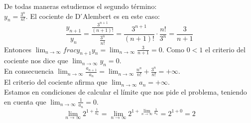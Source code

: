 \documentclass[../Teoría.root.tex]{subfiles}
\begin{document}
De todas maneras estudiemos el segundo término:\\
\(y_n=\frac{3^n}{n!}\).
El cociente de D ́Alembert es en este caso:
\[\frac{y_{n+1}}{y_n}=\frac{\frac{3^{n+1}}{(n+1)!}}{\frac{3^n}{n!}}=\frac{3^{n+1}}{(n+1)!}\cdot\frac{n!}{3^n}=\frac{3}{n+1}\]
Entonces \(\lim_{n\to\infty}frac{y_{n+1}}{y_n}=\lim_{n\to\infty}\frac{3}{n+1}=0\).
Como \(0<1\) el criterio del cociente nos dice que \(\lim_{n\to\infty}y_n=0\).\\
En consecuencia \(\lim_{n\to\infty}\frac{a_{n+1}}{a_n}=\lim_{n\to\infty}\frac{n^n}{n!}+\frac{3^n}{n!}=+\infty\).\\
El criterio del cociente afirma que \(\lim_{n\to\infty}a_n=+\infty\).\\
Estamos en condiciones de calcular el límite que nos pide el problema, teniendo en cuenta que \(\lim_{n\to\infty}\frac{1}{a_n}=0\).
\[\lim_{n\to\infty}2^{1+\frac{1}{a_n}}=\lim_{n\to\infty}2^{1+\lim_{n\to\infty}\frac{1}{a_n}}=2^{1+0}=2\]
\end{document}
